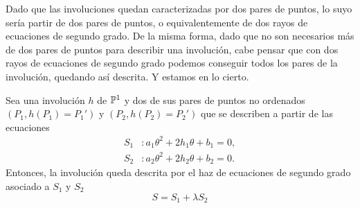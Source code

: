 Dado que las involuciones quedan caracterizadas por dos pares de puntos, lo suyo sería partir de dos pares de puntos, o equivalentemente de dos rayos de ecuaciones de segundo grado. De la misma forma, dado que no son necesarios más de dos pares de puntos para describir una involución, cabe pensar que con dos rayos de ecuaciones de segundo grado podemos conseguir todos los pares de la involución, quedando así descrita. Y estamos en lo cierto.
\begin{prop}
	Sea una involución $h$ de $\mathbb{P}^1$ y dos de sus pares de puntos no ordenados $(P_1,h(P_1)=P_1')$ y $(P_2,h(P_2)=P_2')$ que se describen a partir de las ecuaciones
	\begin{equation*}
	\begin{split}
		S_1&:a_1\theta^2+2h_1\theta+b_1=0,\\
		S_2&:a_2\theta^2+2h_2\theta+b_2=0.
	\end{split}
	\end{equation*}
	Entonces, la involución queda descrita por el haz de ecuaciones de segundo grado asociado a $S_1$ y $S_2$ 
	\begin{equation*}
		S=S_1+\lambda S_2
	\end{equation*}
\end{prop}
